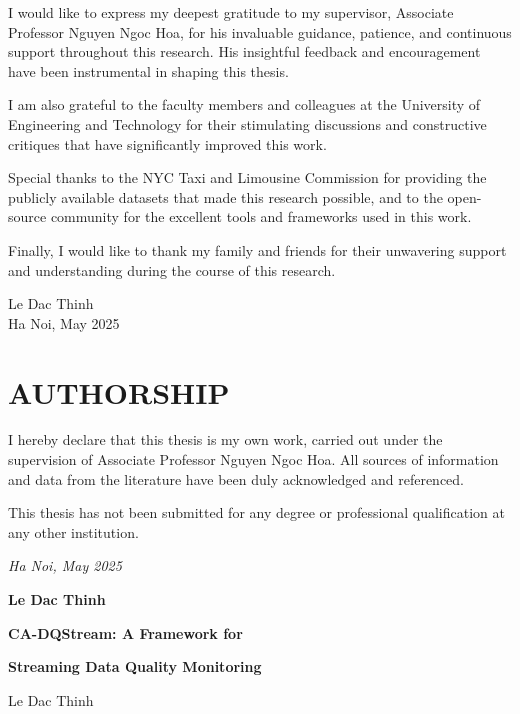 \documentclass[a4paper, reqno, oneside]{book}
\begin{document}
I would like to express my deepest gratitude to my supervisor, Associate Professor Nguyen Ngoc Hoa, for his invaluable guidance, patience, and continuous support throughout this research. His insightful feedback and encouragement have been instrumental in shaping this thesis.

I am also grateful to the faculty members and colleagues at the University of Engineering and Technology for their stimulating discussions and constructive critiques that have significantly improved this work.

Special thanks to the NYC Taxi and Limousine Commission for providing the publicly available datasets that made this research possible, and to the open-source community for the excellent tools and frameworks used in this work.

Finally, I would like to thank my family and friends for their unwavering support and understanding during the course of this research.

\vspace{2cm}
\begin{flushright}
Le Dac Thinh\\
Ha Noi, May 2025
\end{flushright}


\newpage
\chapter*{AUTHORSHIP}
\vspace{20pt}

I hereby declare that this thesis is my own work, carried out under the supervision of Associate Professor Nguyen Ngoc Hoa. All sources of information and data from the literature have been duly acknowledged and referenced.

This thesis has not been submitted for any degree or professional qualification at any other institution.


\vspace{2cm}
\begin{flushright}
{\it Ha Noi, May 2025}

{\bf Le Dac Thinh}
\end{flushright}

\newpage
\centerline{\bf CA-DQStream: A Framework for}
\centerline{\bf Streaming Data Quality Monitoring}
\vspace{10pt}
\centerline{Le Dac Thinh}
\end{document}
